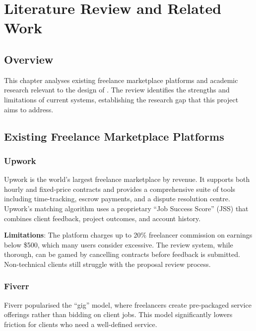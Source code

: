 \chapter{Literature Review and Related Work}

\section{Overview}

This chapter analyses existing freelance marketplace platforms and academic research relevant to the design of \projectname{}. The review identifies the strengths and limitations of current systems, establishing the research gap that this project aims to address.

\section{Existing Freelance Marketplace Platforms}

\subsection{Upwork}

Upwork \cite{upwork2024} is the world's largest freelance marketplace by revenue. It supports both hourly and fixed-price contracts and provides a comprehensive suite of tools including time-tracking, escrow payments, and a dispute resolution centre. Upwork's matching algorithm uses a proprietary ``Job Success Score'' (JSS) that combines client feedback, project outcomes, and account history.

\textbf{Limitations}: The platform charges up to 20\% freelancer commission on earnings below \$500, which many users consider excessive. The review system, while thorough, can be gamed by cancelling contracts before feedback is submitted. Non-technical clients still struggle with the proposal review process.

\subsection{Fiverr}

Fiverr \cite{fiverr2024} popularised the ``gig'' model, where freelancers create pre-packaged service offerings rather than bidding on client jobs. This model significantly lowers friction for clients who need a well-defined service.


